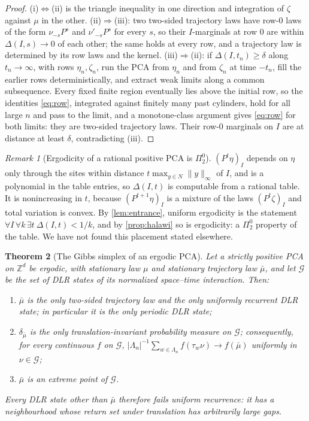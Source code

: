 \documentclass[11pt]{article}
\theoremstyle{plain}
\newtheorem{theorem}{Theorem}[section]
\theoremstyle{definition}
\theoremstyle{remark}
\newtheorem{remark}[theorem]{Remark}
\newcommand{\Z}{\mathbb{Z}}
\newcommand{\Lam}{\Lambda}
\newcommand{\ba}{\bar{\mu}}
\begin{document}
\begin{proof}
(i)$\Leftrightarrow$(ii) is the triangle inequality in one direction and integration of $\zeta$ against $\mu$ in the other. (ii)$\Rightarrow$(iii): two two-sided trajectory laws have row-$0$ laws of the form $\nu_{-s}P^s$ and $\nu'_{-s}P^s$ for every $s$, so their $I$-marginals at row $0$ are within $\Delta(I,s)\to0$ of each other; the same holds at every row, and a trajectory law is determined by its row laws and the kernel. (iii)$\Rightarrow$(ii): if $\Delta(I,t_n)\ge\delta$ along $t_n\to\infty$, with rows $\eta_n,\zeta_n$, run the PCA from $\eta_n$ and from $\zeta_n$ at time $-t_n$, fill the earlier rows deterministically, and extract weak limits along a common subsequence. Every fixed finite region eventually lies above the initial row, so the identities \eqref{eq:row}, integrated against finitely many past cylinders, hold for all large $n$ and pass to the limit, and a monotone-class argument gives \eqref{eq:row} for both limits: they are two-sided trajectory laws. Their row-$0$ marginals on $I$ are at distance at least $\delta$, contradicting (iii).
\end{proof}

\begin{remark}[Ergodicity of a rational positive PCA is $\Pi^0_2$]
\label{rem:pi2}
$(P^t\eta)_I$ depends on $\eta$ only through the sites within distance $t\max_{y\in N}\|y\|_\infty$ of $I$, and is a polynomial in the table entries, so $\Delta(I,t)$ is computable from a rational table. It is nonincreasing in $t$, because $(P^{t+1}\eta)_I$ is a mixture of the laws $(P^t\zeta)_I$ and total variation is convex. By \cref{lem:entrance}, uniform ergodicity is the statement $\forall I\,\forall k\,\exists t\ \Delta(I,t)<1/k$, and by \cref{prop:halawi} so is ergodicity: a $\Pi^0_2$ property of the table. We have not found this placement stated elsewhere.
\end{remark}

\begin{theorem}[The Gibbs simplex of an ergodic PCA]
\label{thm:simplex}
Let a strictly positive PCA on $\Z^d$ be ergodic, with stationary law $\mu$ and stationary trajectory law $\ba$, and let $\mathcal G$ be the set of DLR states of its normalized space--time interaction. Then:
\begin{enumerate}[label=(\roman*)]
\item\label{it:s1} $\ba$ is the only two-sided trajectory law and the only uniformly recurrent DLR state; in particular it is the only periodic DLR state;
\item\label{it:s2} $\delta_{\ba}$ is the only translation-invariant probability measure on $\mathcal G$; consequently, for every continuous $f$ on $\mathcal G$, $|\Lam_n|^{-1}\sum_{w\in\Lam_n}f(\tau_w\nu)\to f(\ba)$ uniformly in $\nu\in\mathcal G$;
\item\label{it:s3} $\ba$ is an extreme point of $\mathcal G$.
\end{enumerate}
Every DLR state other than $\ba$ therefore fails uniform recurrence: it has a neighbourhood whose return set under translation has arbitrarily large gaps.
\end{theorem}
\end{document}

